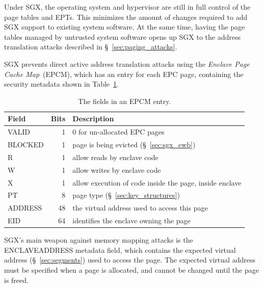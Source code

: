 
Under SGX, the operating system and hypervisor are still in full control of the
page tables and EPTs. This minimizes the amount of changes required to add SGX
support to existing system software. At the same time, having the page tables
managed by untrusted system software opens up SGX to the address translation
attacks described in \S~\ref{sec:paging_attacks}.


SGX prevents direct active address translation attacks using the
\textit{Enclave Page Cache Map}~(EPCM), which has an entry for each EPC page,
containing the security metadata shown in Table~\ref{fig:epcm_entry}.

\begin{table}[hbt]
  \centering
  \begin{tabularx}{\columnwidth}{| l | r | X |}
  \hline
  \textbf{Field} & \textbf{Bits} & \textbf{Description}\\
  \hline
  VALID & 1 & 0 for un-allocated EPC pages \\
  \hline
  BLOCKED & 1 & page is being evicted (\S~\ref{sec:sgx_ewb})\\
  \hline
  R & 1 & allow reads by enclave code\\
  \hline
  W & 1 & allow writes by enclave code\\
  \hline
  X & 1 & allow execution of code inside the page, inside enclave\\
  \hline
  PT & 8 & page type (\S~\ref{sec:key_structures})\\
  \hline
  ADDRESS & 48 & the virtual address used to access this page\\
  \hline
  EID & 64 & identifies the enclave owning the page\\
  \hline
  \end{tabularx}
  \caption{
    The fields in an EPCM entry.
  }
  \label{fig:epcm_entry}
\end{table}


SGX's main weapon against memory mapping attacks is the ENCLAVEADDRESS metadata
field, which contains the expected virtual address (\S~\ref{sec:segments}) used
to access the page. The expected virtual address must be specified when a page
is allocated, and cannot be changed until the page is freed.

